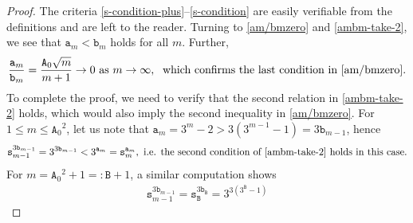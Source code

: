 \documentclass[12pt, twoside]{article}
\theoremstyle{definition}
\numberwithin{equation}{section}
\begin{document}
\begin{proof} 
The criteria \eqref{s-condition-plus}--\eqref{s-condition} are easily verifiable from the definitions and are left to the reader. 
Turning to \eqref{am/bmzero} and \eqref{ambm-take-2}, we see that $\mathtt a_m < \mathtt b_m$ holds for all $m$. Further, 
\[ \frac{\mathtt a_m}{\mathtt b_m} = \frac{\mathtt A_0\sqrt{m}}{m+1} \rightarrow 0 \text{ as }  m \rightarrow \infty, \; \text{ which confirms the last condition in \eqref{am/bmzero}.} \]
To complete the proof, we need to verify that the second relation in \eqref{ambm-take-2} holds, which would also imply the second inequality in \eqref{am/bmzero}. 
\vskip0.1in 
\noindent 
For $1\le m \le {\mathtt A_0}^2$, let us note that $\mathtt a_{m} = 3^{m} - 2 > 3(3^{m-1} - 1) = 3\mathtt b_{m-1}$, hence  
\[\mathtt s_{m-1}^{3\mathtt b_{m-1}} = 3^{3\mathtt b_{m-1}} < 3^{\mathtt a_{m}} = \mathtt s_{m} ^{\mathtt a_{m}}, \text{ i.e. the second condition of \eqref{ambm-take-2} holds in this case.} \] For $m = {\mathtt A_0}^2 + 1=: \mathtt B + 1$, a similar computation shows  
\begin{align*}
	\mathtt s_{m-1}^{3\mathtt b_{m-1}} = \mathtt s_{{\mathtt B}} ^{3 \mathtt b_{\mathtt B}} = 3 ^{3(3^{\mathtt B} - 1)}

\end{align*}
\end{proof}
\end{document}
